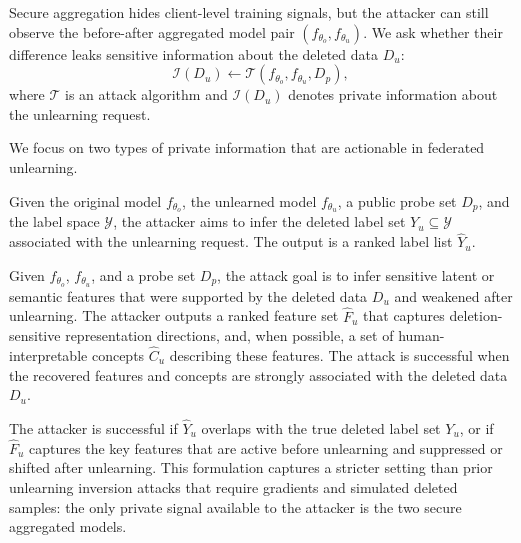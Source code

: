 Secure aggregation hides client-level training signals, but the attacker can still observe the before-after aggregated model pair $(f_{\theta_o}, f_{\theta_u})$. We ask whether their difference leaks sensitive information about the deleted data $D_u$:
\begin{equation}
    \mathcal{I}(D_u) \leftarrow \mathcal{T}(f_{\theta_o},f_{\theta_u},D_p),
    \label{eq:paired_model_inference}
\end{equation}
where $\mathcal{T}$ is an attack algorithm and $\mathcal{I}(D_u)$ denotes private information about the unlearning request.



We focus on two types of private information that are actionable in federated unlearning.

\begin{problem}
Given the original model $f_{\theta_o}$, the unlearned model $f_{\theta_u}$, a public probe set $D_p$, and the label space $\mathcal{Y}$, the attacker aims to infer the deleted label set $Y_u\subseteq \mathcal{Y}$ associated with the unlearning request. The output is a ranked label list $\hat{Y}_u$.
\end{problem}

\begin{problem}
Given $f_{\theta_o}$, $f_{\theta_u}$, and a probe set $D_p$, the attack goal is to infer sensitive latent or semantic features that were supported by the deleted data $D_u$ and weakened after unlearning. The attacker outputs a ranked feature set $\hat{F}_u$ that captures deletion-sensitive representation directions, and, when possible, a set of human-interpretable concepts $\hat{C}_u$ describing these features. The attack is successful when the recovered features and concepts are strongly associated with the deleted data $D_u$.
\end{problem}

 

The attacker is successful if $\hat{Y}_u$ overlaps with the true deleted label set $Y_u$, or if $\hat{F}_u$ captures the key features that are active before unlearning and suppressed or shifted after unlearning. This formulation captures a stricter setting than prior unlearning inversion attacks that require gradients and simulated deleted samples: the only private signal available to the attacker is the two secure aggregated models.


